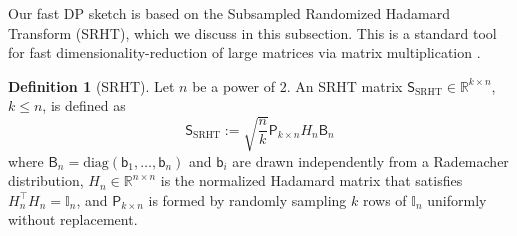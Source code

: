 \documentclass[11pt]{article}
\theoremstyle{definition}
\newtheorem{defn}{Definition}
\theoremstyle{plain}
\newcommand{\reals}{\mathbb{R}}
\providecommand{\brI}{\mathbb{I}}
\begin{document}
Our fast DP sketch is based on the Subsampled Randomized Hadamard Transform (SRHT), which we discuss in this subsection.
This is a standard tool for fast dimensionality-reduction of large matrices via matrix multiplication \citep{tropp2011improved,ailon2013almost}.
\begin{defn}[SRHT]
    \label{defn:SRHT}
    Let \(n\) be a power of \(2\). An SRHT matrix \(\mathsf{S}_{\text{SRHT}} \in \reals^{k \times n}\), \(k \le n\), is defined as
    \begin{equation}
        \label{eq:SRHT_Def}
        \mathsf{S}_{\mathrm{SRHT}} := \sqrt{\frac{n}{k}}\mathsf{P}_{k\times n}H_n\mathsf{B}_n
    \end{equation}
    where \(\mathsf{B}_{n} = \mathrm{diag}(\mathsf{b}_{1}, \ldots, \mathsf{b}_{n})\) and \(\mathsf{b}_{i}\) are drawn independently from a Rademacher distribution,
    \(H_{n} \in \reals^{n \times n}\) is the normalized Hadamard matrix \citep{walsh1923closed} that satisfies \(H_{n}^{\top}H_{n} = \brI_{n}\), and \(\mathsf{P}_{k \times n}\) is formed by randomly sampling \(k\) rows of \(\brI_{n}\) uniformly without replacement.


\end{defn}
\end{document}
